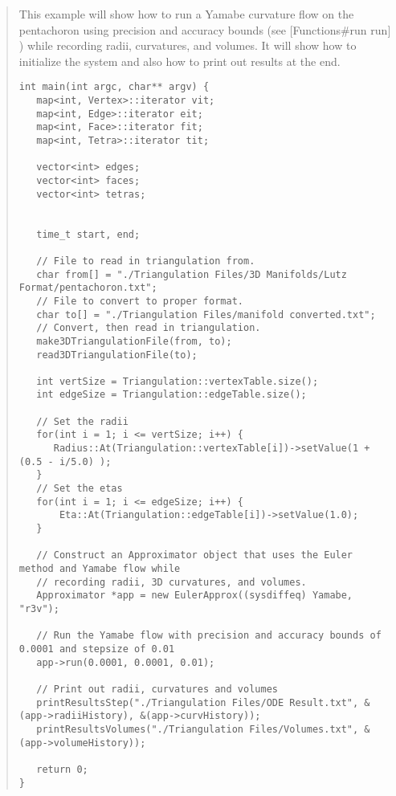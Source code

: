 \documentclass[10pt]{article}%
\begin{document}
\begin{quotation} This example will show how to run a Yamabe curvature flow on the pentachoron using precision and accuracy bounds (see \mbox{$[$}Functions\#run run\mbox{$]$}) while recording radii, curvatures, and volumes. It will show how to initialize the system and also how to print out results at the end.{\small{\begin{verbatim} 
int main(int argc, char** argv) {
   map<int, Vertex>::iterator vit;
   map<int, Edge>::iterator eit;
   map<int, Face>::iterator fit;
   map<int, Tetra>::iterator tit;
     
   vector<int> edges;
   vector<int> faces;
   vector<int> tetras;
    
    
   time_t start, end;
   
   // File to read in triangulation from.
   char from[] = "./Triangulation Files/3D Manifolds/Lutz Format/pentachoron.txt";
   // File to convert to proper format.
   char to[] = "./Triangulation Files/manifold converted.txt";
   // Convert, then read in triangulation.
   make3DTriangulationFile(from, to);
   read3DTriangulationFile(to);

   int vertSize = Triangulation::vertexTable.size();
   int edgeSize = Triangulation::edgeTable.size();
   
   // Set the radii
   for(int i = 1; i <= vertSize; i++) {
      Radius::At(Triangulation::vertexTable[i])->setValue(1 + (0.5 - i/5.0) );        
   }
   // Set the etas
   for(int i = 1; i <= edgeSize; i++) {
       Eta::At(Triangulation::edgeTable[i])->setValue(1.0);
   }

   // Construct an Approximator object that uses the Euler method and Yamabe flow while
   // recording radii, 3D curvatures, and volumes.
   Approximator *app = new EulerApprox((sysdiffeq) Yamabe, "r3v");

   // Run the Yamabe flow with precision and accuracy bounds of 0.0001 and stepsize of 0.01
   app->run(0.0001, 0.0001, 0.01);

   // Print out radii, curvatures and volumes
   printResultsStep("./Triangulation Files/ODE Result.txt", &(app->radiiHistory), &(app->curvHistory));
   printResultsVolumes("./Triangulation Files/Volumes.txt", &(app->volumeHistory));

   return 0;
}
\end{verbatim}
}}
\end{quotation}    

%
\end{document}
